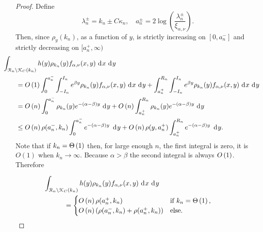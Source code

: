 \begin{proof}
Define 
\[
	\lambda_n^\pm = k_n \pm C \kappa_n, 
	\quad a_n^\pm = 2 \log\left(\frac{\lambda_n^\pm}{\xi_{\alpha,\nu}}\right).
\]
Then, since $\rho_{y}(k_n)$, as a function of $y$, is strictly increasing on $[0,a_n^-]$ and strictly decreasing on $[a_n^+,\infty)$
\begin{align*}
	&\hspace{-20pt}\int_{\Rcal_n \setminus \Kcal_C(k_n)} h(y) \rho_{k_n}(y) 
		f_{\alpha,\nu}(x,y) \dd x \dd y\\
    &= \bigO{1} \int_0^{a_n^-} \int_{-I_n}^{I_n} e^{\beta y} \rho_{k_n}(y) f_{\alpha,\nu}(x,y) \dd x \dd y 
    	+ \int_{a_n^+}^{R_n} \int_{-I_n}^{I_n} e^{\beta y} \rho_{k_n}(y) f_{\alpha,\nu}(x,y) \dd x \dd y \\
    &= \bigO{n} \int_0^{a_n^-} \rho_{k_n}(y) e^{-(\alpha-\beta) y} \dd y 
   		+ \bigO{n} \int_{a_n^+}^{R_n} \rho_{k_n}(y) e^{-(\alpha-\beta) y} \dd y\\
   	&\le \bigO{n}\rho(a_n^-,k_n)\int_0^{a_n^-} e^{-(\alpha-\beta) y} \, \dd y
   		+ \bigO{n} \rho(y,a_n^+) \int_{a_n^+}^{R_n} e^{-(\alpha-\beta) y} \, \dd y.
\end{align*}
Note that if $k_n = \Theta\left(1\right)$ then, for large enough $n$, the first integral is zero, it is $O(1)$ when $k_n \to \infty$. Because $\alpha > \beta$ the second integral is always $O\left(1\right)$. Therefore

\begin{equation}\label{eq:concentration_lemma_integral_bound}
\begin{aligned}
	&\hspace{-30pt}\int_{\Rcal_n \setminus \Kcal_C(k_n)} h(y) \rho_{k_n}(y) f_{\alpha,\nu}(x,y) \dd x \dd y \\
	&= \begin{cases}
		\bigO{n} \rho(a_n^+,k_n) &\mbox{if } k_n = \bigT{1},\\
		\bigO{n} \left(\rho(a_n^-,k_n) + \rho(a_n^+,k_n)\right) &\mbox{else.}
	\end{cases}	
\end{aligned}
\end{equation}


\end{proof}
